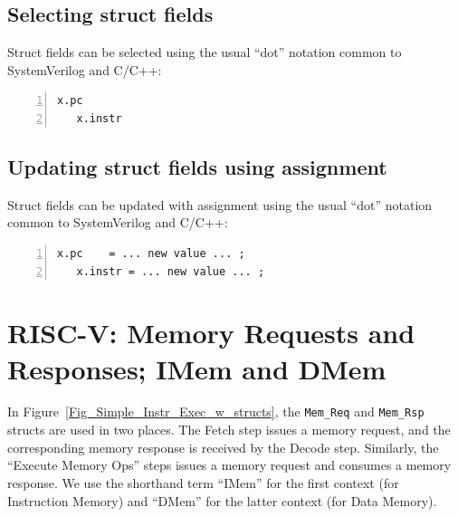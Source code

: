 
\subsection{Selecting struct fields}


Struct fields can be selected using the usual ``dot'' notation common
to SystemVerilog and C/C++:

{\small
\begin{Verbatim}[frame=single, numbers=left]
   x.pc
   x.instr
\end{Verbatim}
}



\subsection{Updating struct fields using assignment}


Struct fields can be updated with assignment using the usual ``dot''
notation common to SystemVerilog and C/C++:

{\small
\begin{Verbatim}[frame=single, numbers=left]
   x.pc    = ... new value ... ;
   x.instr = ... new value ... ;
\end{Verbatim}
}


\section{RISC-V: Memory Requests and Responses; IMem and DMem}


In Figure~\ref{Fig_Simple_Instr_Exec_w_structs}, the \verb|Mem_Req|
and \verb|Mem_Rsp| structs are used in two places.  The Fetch step
issues a memory request, and the corresponding memory response is
received by the Decode step.  Similarly, the ``Execute Memory Ops''
steps issues a memory request and consumes a memory response.  We use
the shorthand term ``IMem'' for the first context (for Instruction
Memory) and ``DMem'' for the latter context (for Data Memory).

